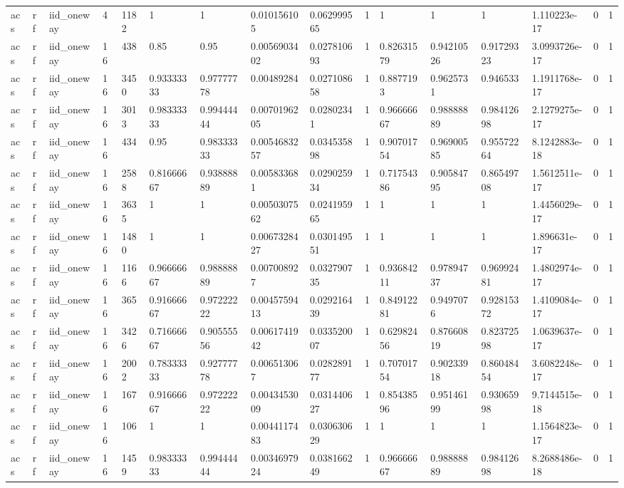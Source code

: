 \begin{tabular}{llllllllllllllll}
acs & rf & iid\_oneway & 4 & 1182 & 1 & 1 & 0.010156105 & 0.062999565 & 1 & 1 & 1 & 1 & 1.110223e-17 & 0 & 1 \\
acs & rf & iid\_oneway & 16 & 438 & 0.85 & 0.95 & 0.0056903402 & 0.027810693 & 1 & 0.82631579 & 0.94210526 & 0.91729323 & 3.0993726e-17 & 0 & 1 \\
acs & rf & iid\_oneway & 16 & 3450 & 0.93333333 & 0.97777778 & 0.00489284 & 0.027108658 & 1 & 0.8877193 & 0.9625731 & 0.946533 & 1.1911768e-17 & 0 & 1 \\
acs & rf & iid\_oneway & 16 & 3013 & 0.98333333 & 0.99444444 & 0.0070196205 & 0.02802341 & 1 & 0.96666667 & 0.98888889 & 0.98412698 & 2.1279275e-17 & 0 & 1 \\
acs & rf & iid\_oneway & 16 & 434 & 0.95 & 0.98333333 & 0.0054683257 & 0.034535898 & 1 & 0.90701754 & 0.96900585 & 0.95572264 & 8.1242883e-18 & 0 & 1 \\
acs & rf & iid\_oneway & 16 & 2588 & 0.81666667 & 0.93888889 & 0.005833681 & 0.029025934 & 1 & 0.71754386 & 0.90584795 & 0.86549708 & 1.5612511e-17 & 0 & 1 \\
acs & rf & iid\_oneway & 16 & 3635 & 1 & 1 & 0.0050307562 & 0.024195965 & 1 & 1 & 1 & 1 & 1.4456029e-17 & 0 & 1 \\
acs & rf & iid\_oneway & 16 & 1480 & 1 & 1 & 0.0067328427 & 0.030149551 & 1 & 1 & 1 & 1 & 1.896631e-17 & 0 & 1 \\
acs & rf & iid\_oneway & 16 & 1166 & 0.96666667 & 0.98888889 & 0.007008927 & 0.032790735 & 1 & 0.93684211 & 0.97894737 & 0.96992481 & 1.4802974e-17 & 0 & 1 \\
acs & rf & iid\_oneway & 16 & 365 & 0.91666667 & 0.97222222 & 0.0045759413 & 0.029216439 & 1 & 0.84912281 & 0.9497076 & 0.92815372 & 1.4109084e-17 & 0 & 1 \\
acs & rf & iid\_oneway & 16 & 3426 & 0.71666667 & 0.90555556 & 0.0061741942 & 0.033520007 & 1 & 0.62982456 & 0.87660819 & 0.82372598 & 1.0639637e-17 & 0 & 1 \\
acs & rf & iid\_oneway & 16 & 2002 & 0.78333333 & 0.92777778 & 0.006513067 & 0.028289177 & 1 & 0.70701754 & 0.90233918 & 0.86048454 & 3.6082248e-17 & 0 & 1 \\
acs & rf & iid\_oneway & 16 & 167 & 0.91666667 & 0.97222222 & 0.0043453009 & 0.031440627 & 1 & 0.85438596 & 0.95146199 & 0.93065998 & 9.7144515e-18 & 0 & 1 \\
acs & rf & iid\_oneway & 16 & 106 & 1 & 1 & 0.0044117483 & 0.030630629 & 1 & 1 & 1 & 1 & 1.1564823e-17 & 0 & 1 \\
acs & rf & iid\_oneway & 16 & 1459 & 0.98333333 & 0.99444444 & 0.0034697924 & 0.038166249 & 1 & 0.96666667 & 0.98888889 & 0.98412698 & 8.2688486e-18 & 0 & 1 \\

\end{tabular}
